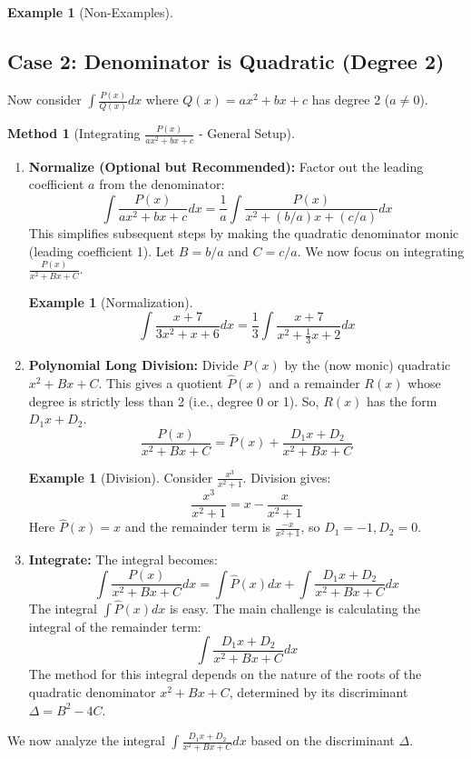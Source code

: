 \documentclass[11pt]{article}
\theoremstyle{plain}
\theoremstyle{definition}
\newtheorem{example}[theorem]{Example}
\newtheorem{method}[theorem]{Method}
\theoremstyle{remark}
\begin{document}
\begin{example}[Non-Examples]
\subsection{Case 2: Denominator is Quadratic (Degree 2)}

Now consider $\int \frac{P(x)}{Q(x)} dx$ where $Q(x) = ax^2+bx+c$ has degree 2 ($a \neq 0$).

\begin{method}[Integrating $\frac{P(x)}{ax^2+bx+c}$ - General Setup]
\leavevmode
\begin{enumerate}
    \item \textbf{Normalize (Optional but Recommended):} Factor out the leading coefficient $a$ from the denominator:
    \[ \int \frac{P(x)}{ax^2+bx+c} dx = \frac{1}{a} \int \frac{P(x)}{x^2 + (b/a)x + (c/a)} dx \]
    This simplifies subsequent steps by making the quadratic denominator monic (leading coefficient 1). Let $B=b/a$ and $C=c/a$. We now focus on integrating $\frac{P(x)}{x^2+Bx+C}$.
    \begin{example}[Normalization]
    \[ \int \frac{x+7}{3x^2+x+6} dx = \frac{1}{3} \int \frac{x+7}{x^2 + \frac{1}{3}x + 2} dx \]
    \end{example}
    \item \textbf{Polynomial Long Division:} Divide $P(x)$ by the (now monic) quadratic $x^2+Bx+C$. This gives a quotient $\hat{P}(x)$ and a remainder $R(x)$ whose degree is strictly less than 2 (i.e., degree 0 or 1). So, $R(x)$ has the form $D_1 x + D_2$.
    \[ \frac{P(x)}{x^2+Bx+C} = \hat{P}(x) + \frac{D_1 x + D_2}{x^2+Bx+C} \]
    \begin{example}[Division]
    Consider $\frac{x^3}{x^2+1}$. Division gives:
    \[ \frac{x^3}{x^2+1} = x - \frac{x}{x^2+1} \]
    Here $\hat{P}(x) = x$ and the remainder term is $\frac{-x}{x^2+1}$, so $D_1=-1, D_2=0$.
    \end{example}
    \item \textbf{Integrate:} The integral becomes:
    \[ \int \frac{P(x)}{x^2+Bx+C} dx = \int \hat{P}(x) dx + \int \frac{D_1 x + D_2}{x^2+Bx+C} dx \]
    The integral $\int \hat{P}(x) dx$ is easy. The main challenge is calculating the integral of the remainder term:
    \[ \int \frac{D_1 x + D_2}{x^2+Bx+C} dx \]
    The method for this integral depends on the nature of the roots of the quadratic denominator $x^2+Bx+C$, determined by its discriminant $\Delta = B^2 - 4C$.
\end{enumerate}
\end{method}

We now analyze the integral $\int \frac{D_1 x + D_2}{x^2+Bx+C} dx$ based on the discriminant $\Delta$.


\end{example}
\end{document}
